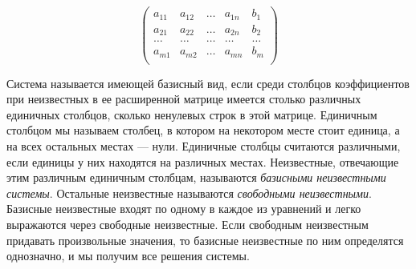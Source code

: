 $$\left(\begin{array}{rrrr|r}
a_{11}&a_{12}&\dots&a_{1n}&b_1\\
a_{21}&a_{22}&\dots&a_{2n}&b_2\\
\dots&\dots&\dots&\dots&\dots\\
a_{m1}&a_{m2}&\dots&a_{mn}&b_m\\
\end{array}\right)$$

Система называется имеющей базисный вид, если среди столбцов коэффициентов при неизвестных в ее расширенной матрице имеется столько  различных  единичных  столбцов, сколько  ненулевых строк в этой матрице. Единичным столбцом мы называем столбец, в котором на некотором месте стоит единица, а на всех остальных местах — нули. Единичные столбцы считаются различными, если единицы у них находятся на различных местах. Неизвестные, отвечающие этим различным единичным столбцам, называются \textit{базисными неизвестными системы}. Остальные неизвестные называются \textit{свободными неизвестными}. Базисные неизвестные входят по одному в каждое из уравнений и легко выражаются через свободные неизвестные. Если свободным неизвестным придавать произвольные значения, то базисные неизвестные по ним определятся однозначно, и мы получим все решения системы.


